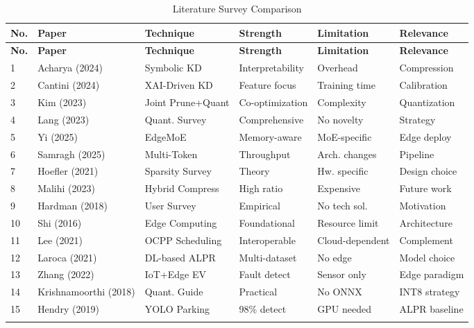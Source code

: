\documentclass[11pt]{report}
\begin{document}
\begin{longtable}{|p{0.5cm}|p{3.2cm}|p{2.5cm}|p{2.2cm}|p{2.2cm}|p{2cm}|}
\hline
\textbf{No.} & \textbf{Paper} & \textbf{Technique} & \textbf{Strength} & \textbf{Limitation} & \textbf{Relevance} \\
\hline
\endfirsthead
\hline
\textbf{No.} & \textbf{Paper} & \textbf{Technique} & \textbf{Strength} & \textbf{Limitation} & \textbf{Relevance} \\
\hline
\endhead
1 & Acharya (2024) & Symbolic KD & Interpretability & Overhead & Compression \\
\hline
2 & Cantini (2024) & XAI-Driven KD & Feature focus & Training time & Calibration \\
\hline
3 & Kim (2023) & Joint Prune+Quant & Co-optimization & Complexity & Quantization \\
\hline
4 & Lang (2023) & Quant. Survey & Comprehensive & No novelty & Strategy \\
\hline
5 & Yi (2025) & EdgeMoE & Memory-aware & MoE-specific & Edge deploy \\
\hline
6 & Samragh (2025) & Multi-Token & Throughput & Arch. changes & Pipeline \\
\hline
7 & Hoefler (2021) & Sparsity Survey & Theory & Hw. specific & Design choice \\
\hline
8 & Malihi (2023) & Hybrid Compress & High ratio & Expensive & Future work \\
\hline
9 & Hardman (2018) & User Survey & Empirical & No tech sol. & Motivation \\
\hline
10 & Shi (2016) & Edge Computing & Foundational & Resource limit & Architecture \\
\hline
11 & Lee (2021) & OCPP Scheduling & Interoperable & Cloud-dependent & Complement \\
\hline
12 & Laroca (2021) & DL-based ALPR & Multi-dataset & No edge & Model choice \\
\hline
13 & Zhang (2022) & IoT+Edge EV & Fault detect & Sensor only & Edge paradigm \\
\hline
14 & Krishnamoorthi (2018) & Quant. Guide & Practical & No ONNX & INT8 strategy \\
\hline
15 & Hendry (2019) & YOLO Parking & 98\% detect & GPU needed & ALPR baseline \\
\hline
\caption{Literature Survey Comparison}
\end{longtable}




\end{document}
